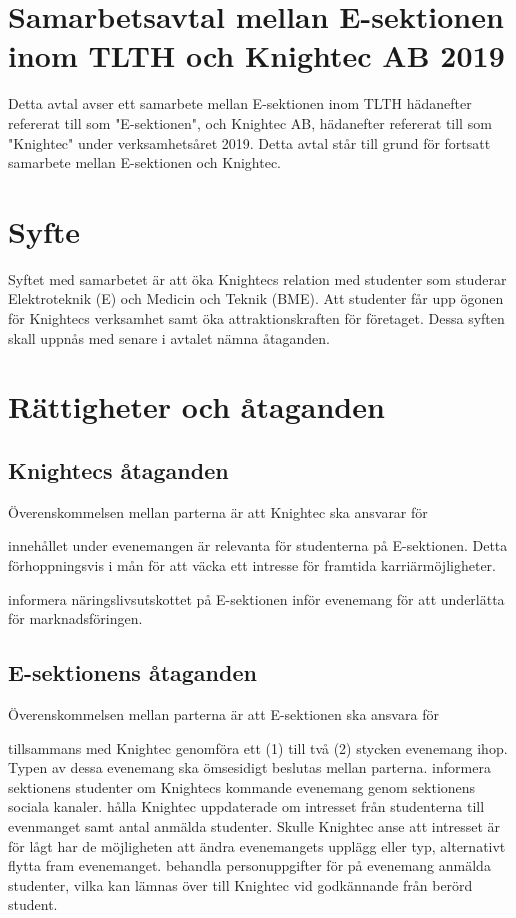 \documentclass[10pt]{article}
\def\year{2019}
\def\doctitle{Samarbetsavtal mellan E-sektionen inom TLTH och Knightec AB  {\year}}
\begin{document}
        \section*{\doctitle}
        Detta avtal avser ett samarbete mellan E-sektionen inom TLTH hädanefter refererat till som "E-sektionen", och Knightec AB, hädanefter refererat till som "Knightec" under verksamhetsåret 2019. Detta avtal står till grund för fortsatt samarbete mellan E-sektionen och Knightec.
\\
        \section{Syfte}
        Syftet med samarbetet är att öka Knightecs relation med studenter som studerar Elektroteknik
(E) och Medicin och Teknik (BME). Att studenter får upp ögonen för Knightecs verksamhet samt öka attraktionskraften för företaget. Dessa syften skall uppnås med senare i avtalet
nämna åtaganden.


        \section{Rättigheter och åtaganden}
        \subsection{Knightecs åtaganden}
        Överenskommelsen mellan parterna är att Knightec ska ansvarar för

        \begin{attsatser}
            \att innehållet under evenemangen är relevanta för studenterna på E-sektionen. Detta förhoppningsvis i mån för att väcka ett intresse för framtida karriärmöjligheter.

            \att informera näringslivsutskottet på E-sektionen inför evenemang för att underlätta för marknadsföringen.

               \end{attsatser}

        \subsection{E-sektionens åtaganden}
        Överenskommelsen mellan parterna är att E-sektionen ska ansvara för
        \begin{attsatser}
            \att tillsammans med Knightec genomföra ett (1) till två (2) stycken evenemang ihop. Typen av dessa evenemang ska ömsesidigt beslutas mellan parterna.
            \att informera sektionens studenter om Knightecs kommande evenemang genom sektionens sociala kanaler. 
            \att hålla Knightec uppdaterade om intresset från studenterna till evenmanget samt antal anmälda studenter. Skulle Knightec anse att intresset är för lågt har de möjligheten att ändra evenemangets upplägg eller typ, alternativt flytta fram evenemanget.
            \att behandla personuppgifter för på evenemang anmälda studenter, vilka kan lämnas över till Knightec vid godkännande från berörd student. 
        \end{attsatser}
        
\end{document}
